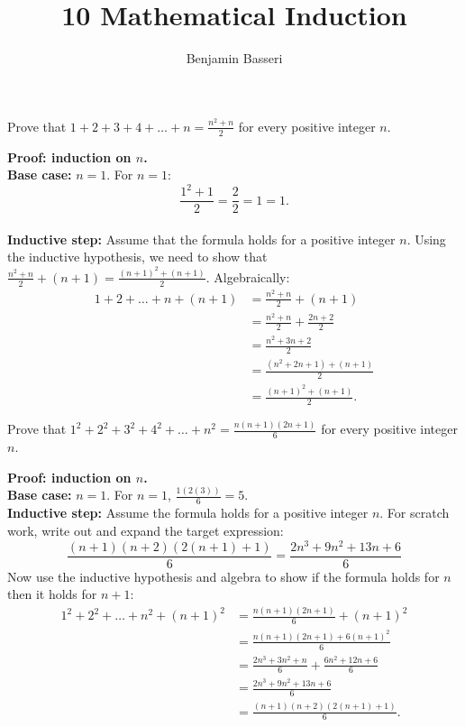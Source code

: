 \documentclass{article}
\title{10 Mathematical Induction}
\author{Benjamin Basseri}
\begin{document}
\maketitle

\begin{problem}
Prove that $1 + 2 + 3 + 4 + \ldots + n = \frac{n^2 + n}{2}$ for every positive integer $n$.
\end{problem}

\textbf{Proof: induction on $n$.}
\\
\textbf{Base case:} $n = 1$. For $n = 1$:
$$\frac{1^2 + 1}{2} = \frac{2}{2} = 1 = 1.$$
\\

\textbf{Inductive step:} Assume that the formula holds for a positive integer $n$. Using the inductive hypothesis, we need to show that $\frac{n^2 + n}{2} + (n + 1) = \frac{(n + 1)^2 + (n + 1)}{2}$. Algebraically:
\begin{align*}
  1 + 2 + \ldots + n + (n + 1) & = \frac{n^2 + n}{2} + (n + 1)          \\
                               & = \frac{n^2 + n}{2} + \frac{2n + 2}{2} \\
                               & = \frac{n^2 + 3n + 2}{2}               \\
                               & = \frac{(n^2 + 2n + 1) + (n + 1)}{2}   \\
                               & = \frac{(n + 1)^2 + (n + 1)}{2}.
\end{align*}

\begin{problem}
Prove that $1^2 + 2^2 + 3^2 + 4^2 + \ldots + n^2 = \frac{n(n + 1)(2n + 1)}{6}$ for every positive integer $n$.
\end{problem}

\textbf{Proof: induction on $n$.}
\\

\textbf{Base case:} $n = 1$. For $n = 1$, $\frac{1(2(3))}{6} = 5$.
\\

\textbf{Inductive step:} Assume the formula holds for a positive integer $n$. For scratch work, write out and expand the target expression:
$$\frac{(n+1)(n+2)(2(n+1)+1)}{6} = \frac{2n^3 + 9n^2 + 13n + 6}{6}$$
Now use the inductive hypothesis and algebra to show if the formula holds for $n$ then it holds for $n+1$:
\begin{align*}
  1^2 + 2^2 + \ldots + n^2 + (n + 1)^2 & = \frac{n(n + 1)(2n + 1)}{6} + (n + 1)^2               \\
                                       & = \frac{n(n + 1)(2n + 1) + 6(n + 1)^2}{6}              \\
                                       & = \frac{2n^3 + 3n^2 + n}{6} + \frac{6n^2 + 12n + 6}{6} \\
                                       & = \frac{2n^3 + 9n^2 + 13n + 6}{6}                      \\
                                       & = \frac{(n + 1)(n + 2)(2(n + 1) + 1)}{6}.
\end{align*}
\end{document}
